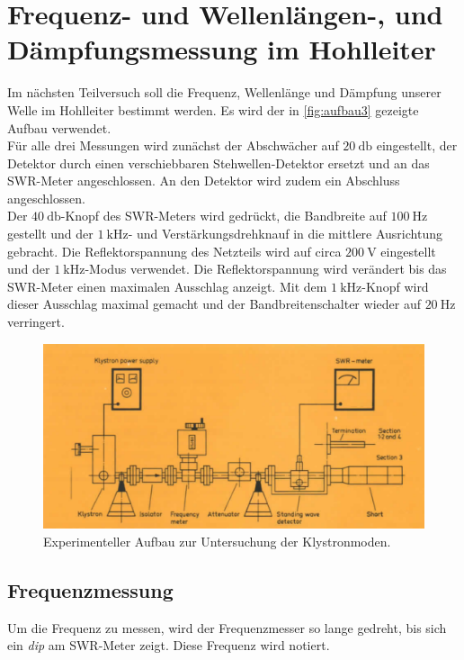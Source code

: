 \section{Frequenz- und Wellenlängen-, und Dämpfungsmessung im Hohlleiter}
Im nächsten Teilversuch soll die Frequenz, Wellenlänge und Dämpfung unserer Welle im Hohlleiter bestimmt werden. Es wird der in \autoref{fig:aufbau3} gezeigte Aufbau verwendet.\\
Für alle drei Messungen wird zunächst der Abschwächer auf $\qty{20}{\decibel}$ eingestellt, der Detektor durch einen verschiebbaren Stehwellen-Detektor ersetzt und an das SWR-Meter angeschlossen. An den Detektor
wird zudem ein Abschluss angeschlossen.\\
Der $\qty{40}{\decibel}$-Knopf des SWR-Meters wird gedrückt, die Bandbreite auf  $\qty{100}{\hertz}$ gestellt und der $\qty{1}{\kilo\hertz}$- und Verstärkungsdrehknauf in die mittlere Ausrichtung
gebracht. Die Reflektorspannung des Netzteils wird auf circa $\qty{200}{\volt}$ eingestellt und der $\qty{1}{\kilo\hertz}$-Modus verwendet. Die Reflektorspannung wird verändert bis das SWR-Meter einen 
maximalen Ausschlag anzeigt. Mit dem $\qty{1}{\kilo\hertz}$-Knopf wird dieser Ausschlag maximal gemacht und der Bandbreitenschalter wieder auf $\qty{20}{\hertz}$ verringert.
\begin{figure}
    \centering
    \includegraphics[scale=0.4]{content/V53_pictures/Aufbau3.png}
    \caption{Experimenteller Aufbau zur Untersuchung der Klystronmoden. \cite{exp_mikro}}
    \label{fig:aufbau3}
\end{figure}

\subsection{Frequenzmessung}
Um die Frequenz zu messen, wird der Frequenzmesser so lange gedreht, bis sich ein \textit{dip} am SWR-Meter zeigt. Diese Frequenz wird notiert.

